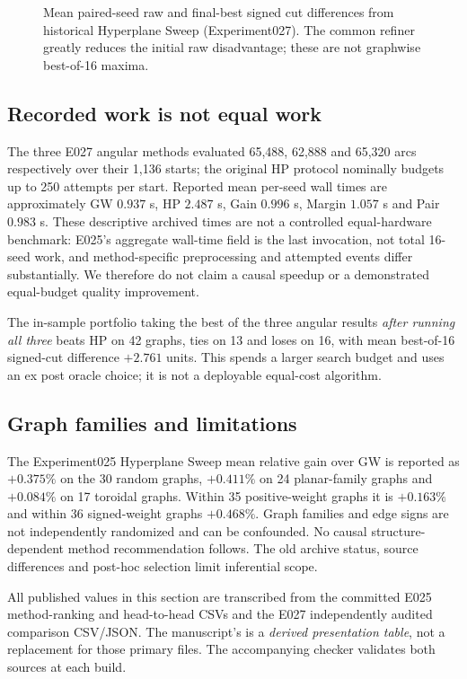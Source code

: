 \begin{figure}[tb]
\centering

\caption{Mean paired-seed raw and final-best signed cut differences from historical Hyperplane Sweep (Experiment027). The common refiner greatly reduces the initial raw disadvantage; these are not graphwise best-of-16 maxima.}
\label{fig:rawgap}
\end{figure}

\subsection{Recorded work is not equal work}
The three E027 angular methods evaluated 65,488, 62,888 and 65,320 arcs respectively over their 1,136 starts; the original HP protocol nominally budgets up to 250 attempts per start. Reported mean per-seed wall times are approximately GW $0.937$ s, HP $2.487$ s, Gain $0.996$ s, Margin $1.057$ s and Pair $0.983$ s. These descriptive archived times are not a controlled equal-hardware benchmark: E025's aggregate wall-time field is the last invocation, not total 16-seed work, and method-specific preprocessing and attempted events differ substantially. We therefore do not claim a causal speedup or a demonstrated equal-budget quality improvement.

The in-sample portfolio taking the best of the three angular results \emph{after running all three} beats HP on 42 graphs, ties on 13 and loses on 16, with mean best-of-16 signed-cut difference $+2.761$ units. This spends a larger search budget and uses an ex post oracle choice; it is not a deployable equal-cost algorithm.

\subsection{Graph families and limitations}
The Experiment025 Hyperplane Sweep mean relative gain over GW is reported as $+0.375\%$ on the 30 random graphs, $+0.411\%$ on 24 planar-family graphs and $+0.084\%$ on 17 toroidal graphs. Within 35 positive-weight graphs it is $+0.163\%$ and within 36 signed-weight graphs $+0.468\%$. Graph families and edge signs are not independently randomized and can be confounded. No causal structure-dependent method recommendation follows. The old archive status, source differences and post-hoc selection limit inferential scope.

All published values in this section are transcribed from the committed E025 method-ranking and head-to-head CSVs and the E027 independently audited comparison CSV/JSON. The manuscript's  is a \emph{derived presentation table}, not a replacement for those primary files. The accompanying checker validates both sources at each build.
